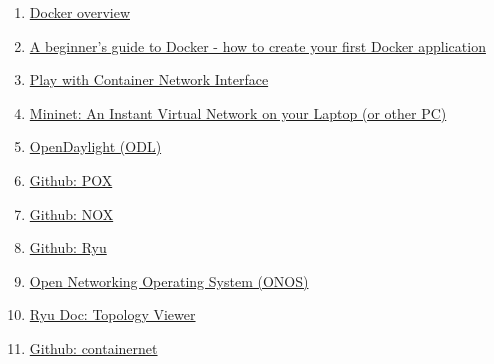 \documentclass[a4paper, oneside, 12pt]{book}
\begin{document}
\begin{enumerate}
		\item
		\label{bib: docker info}
		\href{https://docs.docker.com/get-started/overview/}{Docker overview}
		
		\item
		\label{bib: docker dockerfile}
		\href{https://www.freecodecamp.org/news/a-beginners-guide-to-docker-how-to-create-your-first-docker-application-cc03de9b639f/}{A beginner's guide to Docker - how to create your first Docker application}
		
		\item
		\label{bib: docker y namespaces}
		\href{https://arthurchiao.art/blog/play-with-container-network-if/}{Play with Container Network Interface}
		
		\item
		\label{bib: mininet home page}
		\href{http://mininet.org/}{Mininet: An Instant Virtual Network on your Laptop (or other PC)}
		
		\item 
		\label{bib: opendaylight}
		\href{https://www.opendaylight.org/}{OpenDaylight (ODL)}
		
		\item 
		\label{bib: pox}
		\href{https://github.com/noxrepo/pox}{Github: POX}
		
		\item 
		\label{bib: nox}
		\href{https://github.com/noxrepo/nox}{Github: NOX}
		
		\item 
		\label{bib: ryu}
		\href{https://github.com/faucetsdn/ryu}{Github: Ryu}
		
		\item 
		\label{bib: onos}
		\href{https://opennetworking.org/onos/}{Open Networking Operating System (ONOS)}
		
		\item
		\label{bib: ryu gui}
		\href{https://ryu.readthedocs.io/en/latest/gui.html}{Ryu Doc: Topology Viewer}
		
		\item 
		\label{bib: containernet github}
		\href{https://github.com/containernet/containernet}{Github: containernet}
	\end{enumerate}

	\vspace{20px}
\end{document}
